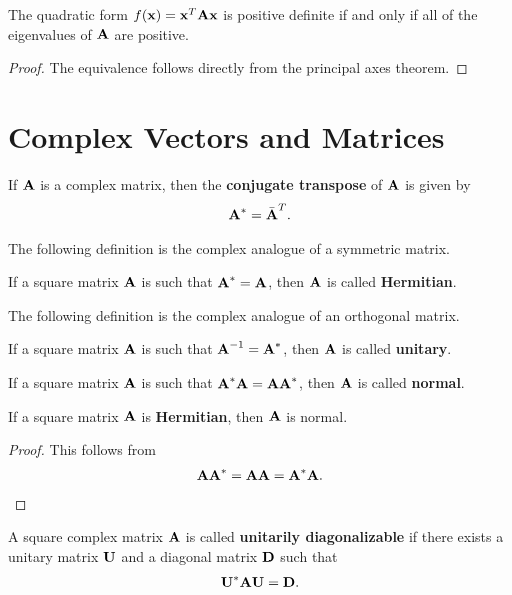 \documentclass{memoir}
\begin{document}
\begin{theorem}
    The quadratic form $f(\boldsymbol{\mathbf{x}})=\boldsymbol{\mathbf{x}}^T \boldsymbol{\mathbf{A}} \boldsymbol{\mathbf{x}}$ is positive definite if and only if all of the eigenvalues of $\boldsymbol{\mathbf{A}}$ are positive.
\end{theorem}
\begin{proof}
    The equivalence follows directly from the principal axes theorem.
\end{proof}

\section{Complex Vectors and Matrices}
\begin{definition}
    If $\boldsymbol{\mathbf{A}}$ is a complex matrix, then the \textbf{conjugate transpose} of $\boldsymbol{\mathbf{A}}$ is given by
    \begin{align*}
        \boldsymbol{\mathbf{A}}^* = \bar{\boldsymbol{\mathbf{A}}}^T.
    \end{align*}
\end{definition}
The following definition is the complex analogue of a symmetric matrix.
\begin{definition}
    If a square matrix $\boldsymbol{\mathbf{A}}$ is such that $\boldsymbol{\mathbf{A}}^* = \boldsymbol{\mathbf{A}}$, then $\boldsymbol{\mathbf{A}}$ is called \textbf{Hermitian}.
\end{definition}
The following definition is the complex analogue of an orthogonal matrix.
\begin{definition}
    If a square matrix $\boldsymbol{\mathbf{A}}$ is such that $\boldsymbol{\mathbf{A}}^{-1} = \boldsymbol{\mathbf{A}}^*$, then $\boldsymbol{\mathbf{A}}$ is called \textbf{unitary}.
\end{definition}
\begin{definition}
    If a square matrix $\boldsymbol{\mathbf{A}}$ is such that $\boldsymbol{\mathbf{A}}^* \boldsymbol{\mathbf{A}} = \boldsymbol{\mathbf{A}} \boldsymbol{\mathbf{A}}^*$, then $\boldsymbol{\mathbf{A}}$ is called \textbf{normal}.
\end{definition}
\begin{theorem}
    If a square matrix $\boldsymbol{\mathbf{A}}$ is \textbf{Hermitian}, then $\boldsymbol{\mathbf{A}}$ is normal.
\end{theorem}
\begin{proof}
    This follows from
    \begin{align*}
        \boldsymbol{\mathbf{A}}\boldsymbol{\mathbf{A}}^* = \boldsymbol{\mathbf{A}} \boldsymbol{\mathbf{A}} = \boldsymbol{\mathbf{A}}^* \boldsymbol{\mathbf{A}}.
    \end{align*}
\end{proof}
\begin{definition}
    A square complex matrix $\boldsymbol{\mathbf{A}}$ is called \textbf{unitarily diagonalizable} if there exists a unitary matrix $\boldsymbol{\mathbf{U}}$ and a diagonal matrix $\boldsymbol{\mathbf{D}}$ such that
    \begin{align*}
        \boldsymbol{\mathbf{U}}^* \boldsymbol{\mathbf{A}} \boldsymbol{\mathbf{U}} = \boldsymbol{\mathbf{D}}.
    \end{align*}
\end{definition}
\end{document}
